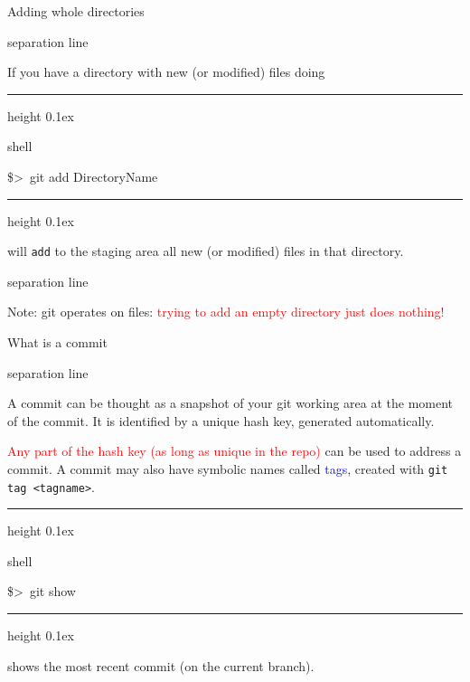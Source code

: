 \documentclass[hyperref={colorlinks}]{beamer}
\newenvironment{shell}{%
\footnotesize\flushleft\hrule height 0.1ex
\tt\begin{beamercolorbox}[sep=1ex,left]{shell}%
}{%
\end{beamercolorbox}
\hrule height 0.1ex
\endflushleft\par
}
\newcommand*{\psone}[1][ant]{\$>~}
\newcommand{\titleline}[1][0.025cm]{%
\begin{beamercolorbox}[wd=\paperwidth,ht=#1,center]{separation line}%
\end{beamercolorbox}%
}
\begin{document}
\begin{frame}{Adding whole directories}
\titleline
If you have a directory with new (or modified) files doing

\begin{shell}
\psone git add DirectoryName
\end{shell} 
will \texttt{add} to the staging area all new (or modified) files in that directory.
\titleline

\alert{Note:} git operates on files: \textcolor{red}{trying to add an empty directory just does nothing!}
\end{frame}


\begin{frame}{What is a commit}
\titleline
A commit can be thought as a \alert{snapshot of your git working area at the moment of the commit.} It is identified by a unique \alert{hash key},  generated automatically.
\smallskip

\textcolor{red}{Any part of the hash key (as long as unique in the repo)} can be used to address a commit. A commit may also have symbolic names called \textcolor{blue}{tags}, created with \texttt{git tag <tagname>}.

\begin{shell}
\psone git show 
\end{shell}
shows the most recent commit (on the current branch).
\end{frame}

\end{document}
